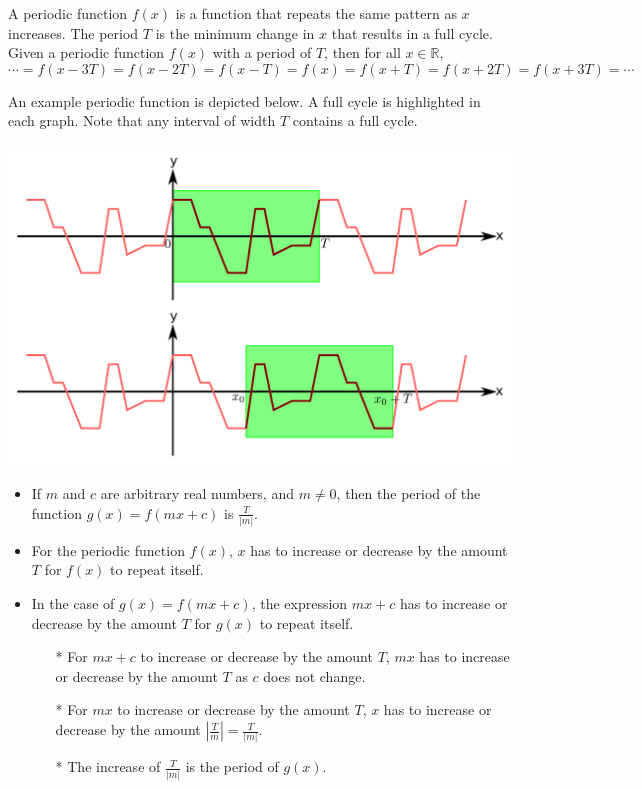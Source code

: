 \documentclass{article}
\begin{document}
A periodic function \(f(x)\) is a function that repeats the same pattern as \(x\) increases. The period \(T\) is the minimum change in \(x\) that results in a full cycle. Given a periodic function \(f(x)\) with a period of \(T\), then for all \(x \in \mathbb{R}\), 
\[\cdots = f(x - 3T) = f(x - 2T) = f(x - T) = f(x) = f(x + T) = f(x + 2T) = f(x + 3T) = \cdots\]

An example periodic function is depicted below. A full cycle is highlighted in each graph. Note that any interval of width \(T\) contains a full cycle.

\includegraphics[width = \textwidth]{periodic_function_example_1}

\begin{itemize}
\item If \(m\) and \(c\) are arbitrary real numbers, and \(m \neq 0\), then the period of the function \(g(x) = f(mx + c)\) is \(\frac{T}{|m|}\). 
\item For the periodic function \(f(x)\), \(x\) has to increase or decrease by the amount \(T\) for \(f(x)\) to repeat itself. 
\item In the case of \(g(x) = f(mx + c)\), the expression \(mx + c\) has to increase or decrease by the amount \(T\) for \(g(x)\) to repeat itself. 
	\begin{itemize}
	\item[*] For \(mx + c\) to increase or decrease by the amount \(T\), \(mx\) has to increase or decrease by the amount \(T\) as \(c\) does not change. 
	\item[*] For \(mx\) to increase or decrease by the amount \(T\), \(x\) has to increase or decrease by the amount \(\left|\frac{T}{m}\right| = \frac{T}{|m|}\). 
	\item[*] The increase of \(\frac{T}{|m|}\) is the period of \(g(x)\).
	\end{itemize}
\end{itemize}
\end{document}
